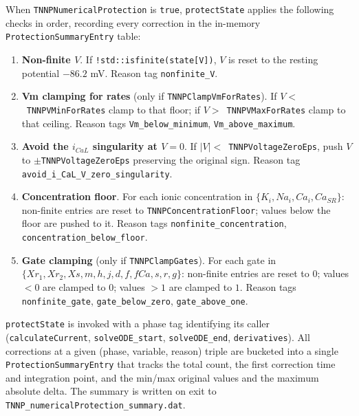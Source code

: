 \documentclass[11pt,a4paper]{article}
\newcommand{\code}[1]{\texttt{\small #1}}
\begin{document}
When \code{TNNPNumericalProtection} is \code{true}, \code{protectState}
applies the following checks in order, recording every correction in
the in-memory \code{ProtectionSummaryEntry} table:

\begin{enumerate}[topsep=0pt,itemsep=2pt]
  \item \textbf{Non-finite $V$}. If \code{!std::isfinite(state[V])},
        $V$ is reset to the resting potential $-86.2$ mV. Reason tag
        \code{nonfinite\_V}.
  \item \textbf{Vm clamping for rates}
        (only if \code{TNNPClampVmForRates}). If $V <
        $~\code{TNNPVMinForRates} clamp to that floor;
        if $V > $~\code{TNNPVMaxForRates} clamp to that ceiling.
        Reason tags \code{Vm\_below\_minimum}, \code{Vm\_above\_maximum}.
  \item \textbf{Avoid the $i_{CaL}$ singularity at $V = 0$}. If
        $\lvert V \rvert < $~\code{TNNPVoltageZeroEps}, push
        $V$ to $\pm$\code{TNNPVoltageZeroEps} preserving the
        original sign. Reason tag
        \code{avoid\_i\_CaL\_V\_zero\_singularity}.
  \item \textbf{Concentration floor}. For each ionic concentration in
        $\{K_{i}, Na_{i}, Ca_{i}, Ca_{SR}\}$: non-finite entries are
        reset to \code{TNNPConcentrationFloor}; values below the floor
        are pushed to it. Reason tags
        \code{nonfinite\_concentration}, \code{concentration\_below\_floor}.
  \item \textbf{Gate clamping} (only if \code{TNNPClampGates}). For
        each gate in $\{Xr_{1}, Xr_{2}, Xs, m, h, j, d, f, fCa, s, r,
        g\}$: non-finite entries are reset to $0$; values $< 0$ are
        clamped to $0$; values $> 1$ are clamped to $1$. Reason tags
        \code{nonfinite\_gate}, \code{gate\_below\_zero},
        \code{gate\_above\_one}.
\end{enumerate}

\code{protectState} is invoked with a phase tag identifying its caller
(\code{calculateCurrent}, \code{solveODE\_start}, \code{solveODE\_end},
\code{derivatives}). All corrections at a given (phase, variable,
reason) triple are bucketed into a single
\code{ProtectionSummaryEntry} that tracks the total count, the first
correction time and integration point, and the min/max original values
and the maximum absolute delta. The summary is written on exit to
\code{TNNP\_numericalProtection\_summary.dat}.

\end{document}
